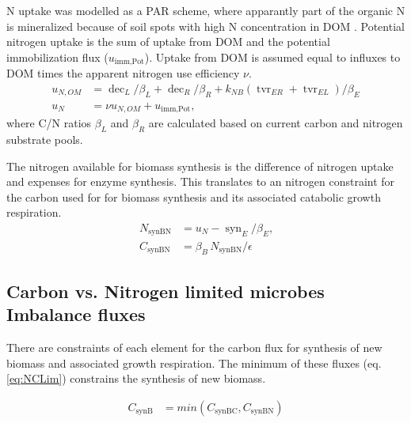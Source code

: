 N uptake was modelled as a PAR scheme, where apparantly part of the organic N is
mineralized because of soil spots with high N concentration in DOM
\citep{Manzoni08}. Potential nitrogen uptake is the sum of uptake from DOM and
the potential immobilization flux ($u_{\operatorname{imm,Pot}}$). Uptake from
DOM is assumed equal to influxes to DOM times the apparent nitrogen use 
efficiency $\nu$.
\begin{subequations}
\label{eq:uN}
\begin{align}
u_{N,OM} &= \operatorname{dec}_L/\beta_L + \operatorname{dec}_R/\beta_R +
k_{NB} (\operatorname{tvr}_{ER} + \operatorname{tvr}_{EL})/\beta_E
\\
u_N &= \nu u_{N,OM} + u_{\operatorname{imm,Pot}}
\text{,}
\end{align}
\end{subequations}
where C/N ratios $\beta_L$ and $\beta_R$ are calculated based on current carbon
and nitrogen substrate pools.  

The nitrogen available for biomass synthesis is the difference of nitrogen
uptake and expenses for enzyme synthesis. This translates to an nitrogen
constraint for the carbon used for for biomass synthesis and its associated
catabolic growth respiration.
\begin{subequations}
\label{eq:synBN}
\begin{align}
N_{\operatorname{synBN}} &= u_N - \operatorname{syn}_E/\beta_E \text{,} \\
C_{\operatorname{synBN}} &= \beta_B \, N_{\operatorname{synBN}}  / \epsilon
\end{align}
\end{subequations}


\subsection{Carbon vs. Nitrogen limited microbes Imbalance fluxes}
There are constraints of each element for the carbon flux for synthesis of new
biomass and associated growth respiration. The minimum of these fluxes (eq.
\ref{eq:NCLim}) constrains the synthesis of new biomass. 

\begin{subequations}
\label{eq:synB}
\begin{align}
\label{eq:NCLim} C_{\operatorname{synB}} &=
min(C_{\operatorname{synBC}}, C_{\operatorname{synBN}} )
\end{align}
\end{subequations}

